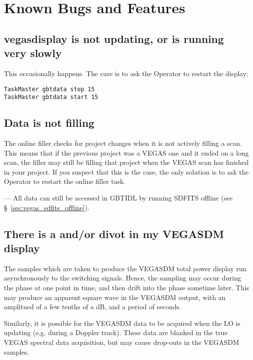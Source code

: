 \newpage

\section{Known Bugs and Features}\label{sec:vegas_bugs}
\subsection{vegasdisplay is not updating, or is running very slowly}
This occasionally happens. The cure is to ask the Operator to restart the
display:

\begin{verbatim}
TaskMaster gbtdata stop 15
TaskMaster gbtdata start 15
\end{verbatim}

\subsection{Data is not filling}

The online filler checks for project changes when it is not actively filling
a scan. This means that if the previous project was a VEGAS one and it ended
on a long scan, the filler may still be filling that project when the VEGAS
scan has finished in your project. If you suspect that this is the case, the
only solution is to ask the Operator to restart the online filler task.

--- All data can still be accessed in \gls{GBTIDL} by running SDFITS offline
(see \S~\ref{sec:vegas_sdfits_offline}).

\subsection{There is a  and/or divot in my VEGASDM display}

The samples which are taken to produce the VEGASDM total power display
run asynchronously to the switching signals. Hence, the sampling may occur
during the  phase at one point in time, and then drift into
the  phase sometime later. This may produce an apparent square
wave in the VEGASDM output, with an amplitued of a few tenths of a dB, and
a period of seconds.

Similarly, it is possible for the VEGASDM data to be acquired when the \gls{LO}
is updating (e.g. during a Doppler track). These data are blanked in the
true VEGAS spectral data acquisition, but may cause drop-outs in the
VEGASDM samples.




